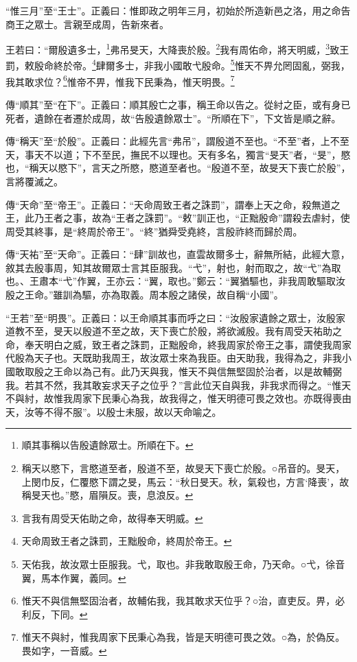 {\noindent\shu{}\fzkt “惟三月”至“王士”。正義曰：惟即政之明年三月，初始於所造新邑之洛，用之命告商王之眾士。言親至成周，告新來者。 \par}

王若曰：“爾殷遺多士，\footnote{順其事稱以告殷遺餘眾士。所順在下。}弗吊旻天，大降喪於殷。\footnote{稱天以愍下，言愍道至者，殷道不至，故旻天下喪亡於殷。○吊音的。旻天，上閔巾反，仁覆愍下謂之旻，馬云：“秋日旻天。秋，氣殺也，方言‘降喪’，故稱旻天也。”愍，眉隕反。喪，息浪反。}我有周佑命，將天明威，\footnote{言我有周受天佑助之命，故得奉天明威。}致王罰，敕殷命終於帝。\footnote{天命周致王者之誅罰，王黜殷命，終周於帝王。}肆爾多士，非我小國敢弋殷命。\footnote{天佑我，故汝眾士臣服我。弋，取也。非我敢取殷王命，乃天命。○弋，徐音翼，馬本作翼，義同。}惟天不畀允罔固亂，弼我，我其敢求位？\footnote{惟天不與信無堅固治者，故輔佑我，我其敢求天位乎？○治，直吏反。畀，必利反，下同。}惟帝不畀，惟我下民秉為，惟天明畏。\footnote{惟天不與紂，惟我周家下民秉心為我，皆是天明德可畏之效。○為，於偽反。畏如字，一音威。}

{\noindent\zhuan{}\fzbyks 傳“順其”至“在下”。正義曰：順其殷亡之事，稱王命以告之。從紂之臣，或有身已死者，遺餘在者遷於成周，故“告殷遺餘眾士”。“所順在下”，下文皆是順之辭。 \par}

{\noindent\zhuan{}\fzbyks 傳“稱天”至“於殷”。正義曰：此經先言“弗吊”，謂殷道不至也。“不至”者，上不至天，事天不以道；下不至民，撫民不以理也。天有多名，獨言“旻天”者，“旻”，愍也，“稱天以愍下”，言天之所愍，愍道至者也。“殷道不至，故旻天下喪亡於殷”，言將覆滅之。 \par}

{\noindent\zhuan{}\fzbyks 傳“天命”至“帝王”。正義曰：“天命周致王者之誅罰”，謂奉上天之命，殺無道之王，此乃王者之事，故為“王者之誅罰”。“敕”訓正也，“正黜殷命”謂殺去虐紂，使周受其終事，是“終周於帝王”。“終”猶舜受堯終，言殷祚終而歸於周。 \par}

{\noindent\zhuan{}\fzbyks 傳“天祐”至“天命”。正義曰：“肆”訓故也，直雲故爾多士，辭無所結，此經大意，敘其去殷事周，知其故爾眾士言其臣服我。“弋”，射也，射而取之，故“弋”為取也。、王肅本“弋”作翼，王亦云：“翼，取也。”鄭云：“翼猶驅也，非我周敢驅取汝殷之王命。”雖訓為驅，亦為取義。周本殷之諸侯，故自稱“小國”。 \par}

{\noindent\shu{}\fzkt “王若”至“明畏”。正義曰：以王命順其事而呼之曰：“汝殷家遺餘之眾士，汝殷家道教不至，旻天以殷道不至之故，天下喪亡於殷，將欲滅殷。我有周受天祐助之命，奉天明白之威，致王者之誅罰，正黜殷命，終我周家於帝王之事，謂使我周家代殷為天子也。天既助我周王，故汝眾士來為我臣。由天助我，我得為之，非我小國敢取殷之王命以為己有。此乃天與我，惟天不與信無堅固於治者，以是故輔弼我。若其不然，我其敢妄求天子之位乎？”言此位天自與我，非我求而得之。“惟天不與紂，故惟我周家下民秉心為我，故我得之，惟天明德可畏之效也。亦既得喪由天，汝等不得不服”。以殷士未服，故以天命喻之。 \par}

